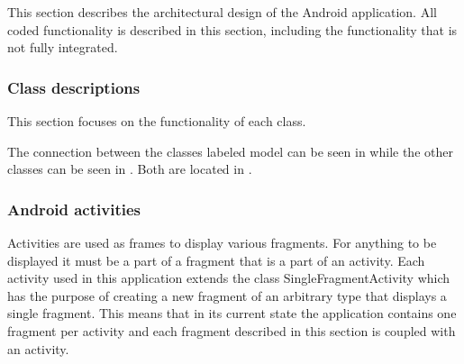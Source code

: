 This section describes the architectural design of the Android application. All coded functionality is described in this section, including the functionality that is not fully integrated. 
\subsubsection{Class descriptions}\label{sec:and_classdescription}
This section focuses on the functionality of each class.

The connection between the classes labeled model can be seen in
 while the other classes can be seen in
. Both are located in .

\subsubsection{Android activities} 
Activities are used as frames to display various fragments. For anything to be
displayed it must be a part of a fragment that is a part of an activity. Each
activity used in this application extends the class SingleFragmentActivity which
has the purpose of creating a new fragment of an arbitrary type that displays a
single fragment. This means that in its current state the application contains
one fragment per activity and each fragment described in this section is coupled
with an activity.


